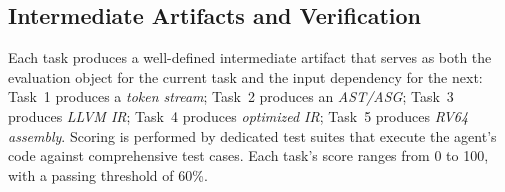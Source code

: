 \subsection{Intermediate Artifacts and Verification}

Each task produces a well-defined intermediate artifact that serves as both the evaluation object for the current task and the input dependency for the next:
Task~1 produces a \emph{token stream}; Task~2 produces an \emph{AST/ASG}; Task~3 produces \emph{LLVM IR}; Task~4 produces \emph{optimized IR}; Task~5 produces \emph{RV64 assembly}.
Scoring is performed by dedicated test suites that execute the agent's code against comprehensive test cases.
Each task's score ranges from 0 to 100, with a passing threshold of 60\%.